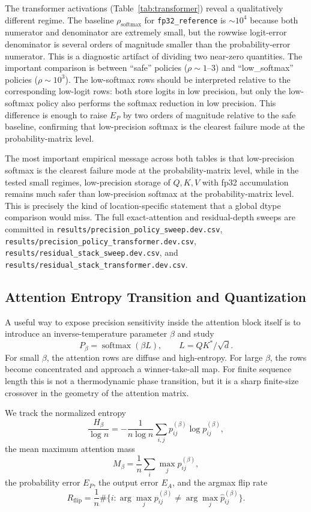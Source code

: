 The transformer activations (Table~\ref{tab:transformer}) reveal a qualitatively different regime. The baseline $\rho_{\mathrm{softmax}}$ for \texttt{fp32\_reference} is $\sim\!10^4$ because both numerator and denominator are extremely small, but the rowwise logit-error denominator is several orders of magnitude smaller than the probability-error numerator. This is a diagnostic artifact of dividing two near-zero quantities. The important comparison is between ``safe'' policies ($\rho \sim 1$--$3$) and ``low\_softmax'' policies ($\rho \sim 10^3$). The low-softmax rows should be interpreted relative to the corresponding low-logit rows: both store logits in low precision, but only the low-softmax policy also performs the softmax reduction in low precision. This difference is enough to raise $E_P$ by two orders of magnitude relative to the safe baseline, confirming that low-precision softmax is the clearest failure mode at the probability-matrix level.

The most important empirical message across both tables is that low-precision softmax is the clearest failure mode at the probability-matrix level, while in the tested small regimes, low-precision storage of $Q,K,V$ with fp32 accumulation remains much safer than low-precision softmax at the probability-matrix level. This is precisely the kind of location-specific statement that a global dtype comparison would miss. The full exact-attention and residual-depth sweeps are committed in \texttt{results/precision\_policy\_sweep.dev.csv}, \texttt{results/precision\_policy\_transformer.dev.csv}, \texttt{results/residual\_stack\_sweep.dev.csv}, and \texttt{results/residual\_stack\_transformer.dev.csv}.

\subsection{Attention Entropy Transition and Quantization}

A useful way to expose precision sensitivity inside the attention block itself is to introduce an inverse-temperature parameter $\beta$ and study
\[
    P_\beta = \operatorname{softmax}(\beta L),
    \qquad
    L = QK^*/\sqrt d.
\]
For small $\beta$, the attention rows are diffuse and high-entropy. For large $\beta$, the rows become concentrated and approach a winner-take-all map. For finite sequence length this is not a thermodynamic phase transition, but it is a sharp finite-size crossover in the geometry of the attention matrix.

We track the normalized entropy
\[
    \frac{H_\beta}{\log n}
    =
    -\frac{1}{n\log n}
    \sum_{i,j} p_{ij}^{(\beta)} \log p_{ij}^{(\beta)},
\]
the mean maximum attention mass
\[
    M_\beta = \frac1n\sum_i \max_j p_{ij}^{(\beta)},
\]
the probability error $E_P$, the output error $E_A$, and the argmax flip rate
\[
    R_{\mathrm{flip}}
    =
    \frac1n
    \#\{i : \arg\max_j p_{ij}^{(\beta)}
    \neq
    \arg\max_j \widehat p_{ij}^{(\beta)}\}.
\]

